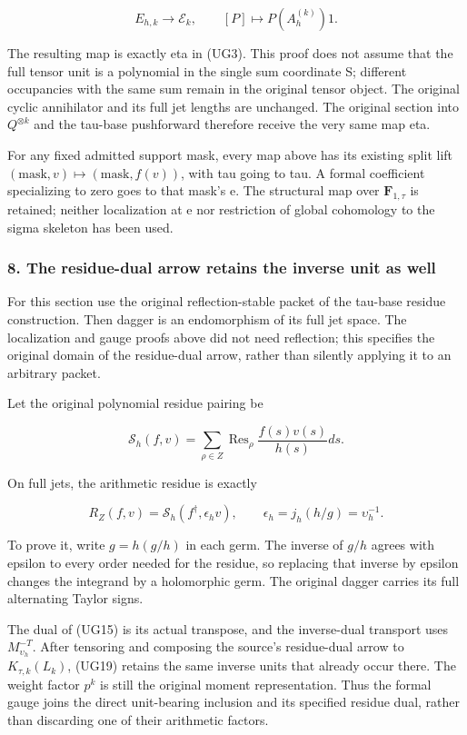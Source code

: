 \documentclass{article}
\begin{document}
\[
E_{h,k}\longrightarrow\mathcal E_k,
\qquad[P]\longmapsto P(A_h^{(k)})1.
\]

The resulting map is exactly eta in (UG3). This proof does not assume that the full tensor unit is a polynomial in the single sum coordinate S; different occupancies with the same sum remain in the original tensor object. The original cyclic annihilator and its full jet lengths are unchanged. The original section into \(Q^{\otimes k}\) and the tau-base pushforward therefore receive the very same map eta.

For any fixed admitted support mask, every map above has its existing split lift \((\mathrm{mask},v)\mapsto(\mathrm{mask},f(v))\), with tau going to tau. A formal coefficient specializing to zero goes to that mask's e. The structural map over \(\mathbf F_{1,\tau}\) is retained; neither localization at e nor restriction of global cohomology to the sigma skeleton has been used.

\subsubsection{8. The residue-dual arrow retains the inverse unit as well}\label{endpoint-f1_unit_gauge--the-residue-dual-arrow-retains-the-inverse-unit-as-well}

For this section use the original reflection-stable packet of the tau-base residue construction. Then dagger is an endomorphism of its full jet space. The localization and gauge proofs above did not need reflection; this specifies the original domain of the residue-dual arrow, rather than silently applying it to an arbitrary packet.

Let the original polynomial residue pairing be

\[
\mathscr S_h(f,v)=\sum_{\rho\in Z}\operatorname{Res}_\rho
\frac{f(s)v(s)}{h(s)}ds.
\]

On full jets, the arithmetic residue is exactly

\[
\boxed{R_Z(f,v)=\mathscr S_h(f^\dagger,\epsilon_hv),
\qquad\epsilon_h=j_h(h/g)=\upsilon_h^{-1}.}
\tag{UG19}
\]

To prove it, write \(g=h(g/h)\) in each germ. The inverse of \(g/h\) agrees with epsilon to every order needed for the residue, so replacing that inverse by epsilon changes the integrand by a holomorphic germ. The original dagger carries its full alternating Taylor signs.

The dual of (UG15) is its actual transpose, and the inverse-dual transport uses \(M_{\upsilon_h}^{-T}\). After tensoring and composing the source's residue-dual arrow to \(K_{\tau,k}(L_k)\), (UG19) retains the same inverse units that already occur there. The weight factor \(p^k\) is still the original moment representation. Thus the formal gauge joins the direct unit-bearing inclusion and its specified residue dual, rather than discarding one of their arithmetic factors.
\end{document}
